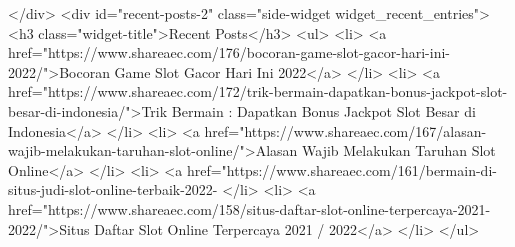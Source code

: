 {			</div>
		<div id="recent-posts-2" class="side-widget widget_recent_entries">
		<h3 class="widget-title">Recent Posts</h3>
		<ul>
											<li>
					<a href="https://www.shareaec.com/176/bocoran-game-slot-gacor-hari-ini-2022/">Bocoran Game Slot Gacor Hari Ini 2022</a>
									</li>
											<li>
					<a href="https://www.shareaec.com/172/trik-bermain-dapatkan-bonus-jackpot-slot-besar-di-indonesia/">Trik Bermain : Dapatkan Bonus Jackpot Slot Besar di Indonesia</a>
									</li>
											<li>
					<a href="https://www.shareaec.com/167/alasan-wajib-melakukan-taruhan-slot-online/">Alasan Wajib Melakukan Taruhan Slot Online</a>
									</li>
											<li>
					<a href="https://www.shareaec.com/161/bermain-di-situs-judi-slot-online-terbaik-2022-%
									</li>
											<li>
					<a href="https://www.shareaec.com/158/situs-daftar-slot-online-terpercaya-2021-2022/">Situs Daftar Slot Online Terpercaya 2021 / 2022</a>
									</li>
					</ul>

}
